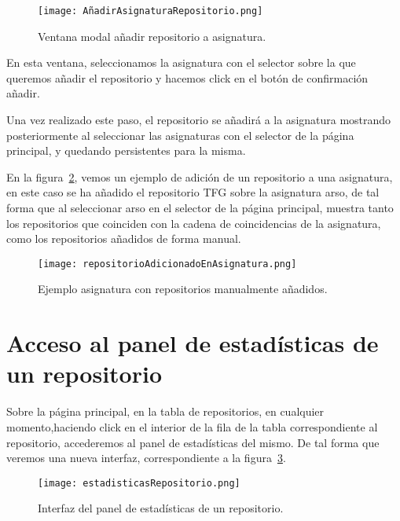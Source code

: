     \begin{figure}[h!]
      \texttt{[image: AñadirAsignaturaRepositorio.png]}
      \caption{Ventana modal añadir repositorio a asignatura.}
      \label{figure:repoAAsignatura}
    \end{figure}

    En esta ventana, seleccionamos la asignatura con el selector sobre la que queremos añadir el repositorio y hacemos click en el botón de confirmación añadir. 

    Una vez realizado este paso, el repositorio se añadirá a la asignatura mostrando posteriormente al seleccionar las asignaturas con el selector de la página principal, y quedando persistentes para la misma.

    En la figura~\ref{figure:asignaturaConReposManuales}, vemos un ejemplo de adición de un repositorio a una asignatura, en este caso se ha añadido el repositorio TFG sobre la asignatura arso, de tal forma que al seleccionar arso en el selector de la página principal, muestra tanto los repositorios que coinciden con la cadena de coincidencias de la asignatura, como los repositorios añadidos de forma manual.

    \begin{figure}[h!]
      \texttt{[image: repositorioAdicionadoEnAsignatura.png]}
      \caption{Ejemplo asignatura con repositorios manualmente añadidos.}
      \label{figure:asignaturaConReposManuales}
    \end{figure}

\section{Acceso al panel de estadísticas de un repositorio}

    Sobre la página principal, en la tabla de repositorios, en cualquier momento,haciendo click en el interior de la fila de la tabla correspondiente al repositorio, accederemos al panel de estadísticas del mismo. De tal forma que veremos una nueva interfaz, correspondiente a la figura~\ref{figure:estadRepo}.

    \begin{figure}[h!]
      \texttt{[image: estadisticasRepositorio.png]}
      \caption{Interfaz del panel de estadísticas de un repositorio.}
      \label{figure:estadRepo}
    \end{figure}

